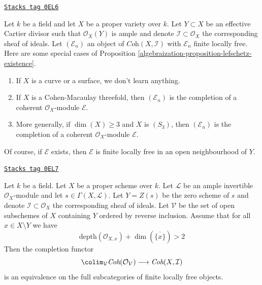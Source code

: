 \begin{example}
\label{algebraization-example-lefschetz-existence}
\href{https://stacks.math.columbia.edu/tag/0EL6}{\texttt{Stacks tag 0EL6}}

Let $k$ be a field and let $X$ be a proper variety over $k$.
Let $Y \subset X$ be an effective Cartier divisor such that
$\mathcal{O}_X(Y)$ is ample and denote
$\mathcal{I} \subset \mathcal{O}_X$ the corresponding
sheaf of ideals. Let $(\mathcal{E}_n)$ an object
of $\textit{Coh}(X, \mathcal{I})$ with $\mathcal{E}_n$
finite locally free.
Here are some special cases of
Proposition \ref{algebraization-proposition-lefschetz-existence}.
\begin{enumerate}
\item If $X$ is a curve or a surface, we don't learn anything.
\item If $X$ is a Cohen-Macaulay threefold, then
$(\mathcal{E}_n)$ is the completion of a coherent
$\mathcal{O}_X$-module $\mathcal{E}$.
\item More generally, if $\dim(X) \geq 3$ and $X$ is $(S_3)$, then
$(\mathcal{E}_n)$ is the completion of a coherent
$\mathcal{O}_X$-module $\mathcal{E}$.
\end{enumerate}
Of course, if $\mathcal{E}$ exists, then $\mathcal{E}$ is finite locally
free in an open neighbourhood of $Y$.
\end{example}

\begin{proposition}
\label{algebraization-proposition-lefschetz-equivalence}
\href{https://stacks.math.columbia.edu/tag/0EL7}{\texttt{Stacks tag 0EL7}}

Let $k$ be a field. Let $X$ be a proper scheme over $k$.
Let $\mathcal{L}$ be an ample invertible $\mathcal{O}_X$-module
and let $s \in \Gamma(X, \mathcal{L})$. Let $Y = Z(s)$
be the zero scheme of $s$ and denote $\mathcal{I} \subset \mathcal{O}_X$
the corresponding sheaf of ideals.
Let $\mathcal{V}$ be the set of open subschemes of $X$ containing $Y$
ordered by reverse inclusion.
Assume that for all $x \in X \setminus Y$ we have
$$
\text{depth}(\mathcal{O}_{X, x}) + \dim(\overline{\{x\}}) > 2
$$
Then the completion functor
$$
\colim_\mathcal{V}
\textit{Coh}(\mathcal{O}_V)
\longrightarrow
\textit{Coh}(X, \mathcal{I})
$$
is an equivalence on the full subcategories of finite locally free objects.
\end{proposition}


